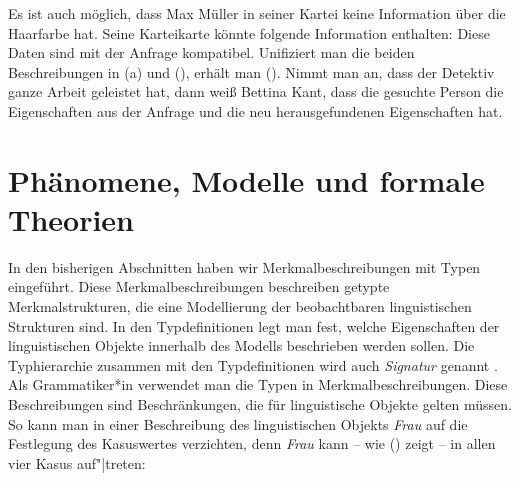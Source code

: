 Es ist auch möglich, dass Max Müller in seiner Kartei keine Information über die Haarfarbe hat. Seine Karteikarte
könnte folgende Information enthalten:
\ea
{}
\z
Diese Daten sind mit der Anfrage kompatibel. Unifiziert man die beiden Beschreibungen in (a) und (),
erhält man (). Nimmt man an, dass der Detektiv ganze Arbeit geleistet hat, dann weiß Bettina Kant,
dass die gesuchte Person die Eigenschaften aus der Anfrage und die neu herausgefundenen Eigenschaften hat.

\section{Phänomene, Modelle und formale Theorien}
\label{sec-modelle-theorien}

In den bisherigen Abschnitten haben wir Merkmalbeschreibungen mit Typen eingeführt. Diese
Merkmalbeschreibungen beschreiben getypte Merkmalstrukturen, die eine Modellierung der beobachtbaren
linguistischen Strukturen sind. In den Typdefinitionen legt man fest, welche
Eigenschaften der linguistischen Objekte innerhalb des Modells beschrieben werden sollen. Die Typhierarchie zusammen mit den Typdefinitionen wird
auch \emph{Signatur} genannt \citep[102]{Richter2024a}. %
Als Grammatiker*in verwendet man die Typen in
Merkmalbeschreibungen. Diese Beschreibungen sind Beschränkungen, die für linguistische Objekte
gelten müssen. So kann man \zb in einer Beschreibung des linguistischen Objekts \emph{Frau} auf die
Festlegung des Kasuswertes verzichten, denn \emph{Frau} kann -- wie () zeigt -- in allen vier
Kasus auf"|treten:

